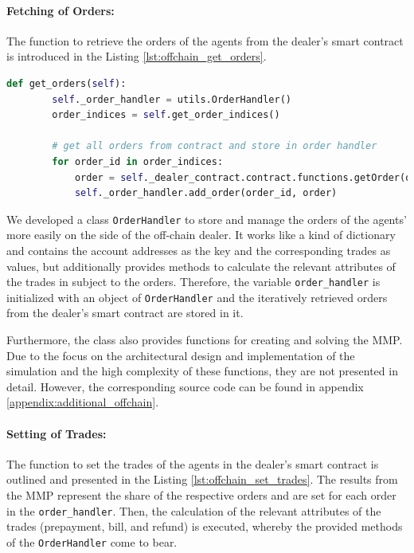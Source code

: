 \paragraph{Fetching of Orders:} The function to retrieve the orders of the agents from the dealer's 
smart contract is introduced in the Listing \ref{lst:offchain_get_orders}.

\begin{lstlisting}[float=htbp, label=lst:offchain_get_orders, caption=Fetching of Orders from Smart Contract Dealer, language=Python]
    def get_orders(self):
        self._order_handler = utils.OrderHandler()
        order_indices = self.get_order_indices()

        # get all orders from contract and store in order handler
        for order_id in order_indices:
            order = self._dealer_contract.contract.functions.getOrder(order_id).call()
            self._order_handler.add_order(order_id, order)
\end{lstlisting}

We developed a class \verb|OrderHandler| to store and manage the orders of the agents' more easily
on the side of the off-chain dealer. 
It works like a kind of dictionary and contains the account addresses as the key 
and the corresponding trades as values, but additionally provides methods to calculate
the relevant attributes of the trades in subject to the orders.
Therefore, the variable \verb|order_handler| is initialized with an object of \verb|OrderHandler|
and the iteratively retrieved orders from the dealer's smart contract are stored in it.

Furthermore, the class also provides functions for creating and solving the MMP.
Due to the focus on the architectural design and implementation of the simulation and the high complexity
of these functions, they are not presented in detail. However, the corresponding source code can be found in appendix \ref{appendix:additional_offchain}.

\paragraph{Setting of Trades:} The function to set the trades of the agents in the dealer's smart contract 
is outlined and presented in the Listing \ref{lst:offchain_set_trades}.
The results from the MMP represent the share of the respective orders and are set for 
each order in the \verb|order_handler|. Then, the calculation of the relevant attributes of the trades
(prepayment, bill, and refund) is executed, whereby the provided methods of the \verb|OrderHandler| come to bear.

